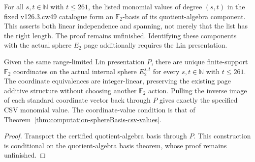 \begin{theorem}
  \label{thm:lin-e2-basis-certification}
  \notready
  For all $s,t\in\mathbb N$ with $t\le261$, the listed monomial values of
  degree $(s,t)$ in the fixed v126.3.cw49 catalogue form an
  $\mathbb F_2$-basis of its quotient-algebra component. This asserts both
  linear independence and spanning, not merely that the list has the right
  length. The proof remains unfinished. Identifying these components
  with the actual sphere $E_2$ page additionally requires the Lin
  presentation.
\end{theorem}

\begin{theorem}
  \label{thm:lin-sphere-basis-interface}
  \notready
  Given the same range-limited Lin presentation $P$, there are unique
  finite-support $\mathbb F_2$ coordinates on the actual internal sphere
  $E_2^{s,t}$ for every $s,t\in\mathbb N$ with $t\le261$.
  The coordinate equivalences are integer-linear, preserving the existing
  page additive structure without choosing another $\mathbb F_2$ action.
  Pulling the inverse image of each standard coordinate vector back
  through $P$ gives exactly the specified CSV monomial value.
  The coordinate-value condition is that of
  Theorem~\ref{thm:computation-sphereBasis-csv-values}.
\end{theorem}
\begin{proof}
  Transport the certified quotient-algebra basis through $P$.
  This construction is conditional on the quotient-algebra basis theorem,
  whose proof remains unfinished.
\end{proof}

